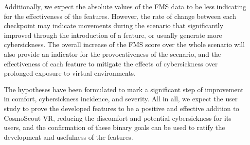 Additionally, we expect the absolute values of the FMS data to be less indicating for the effectiveness of the
features.
However, the rate of change between each checkpoint may indicate movements during the scenario that significantly
improved through the introduction of a feature, or usually generate more cybersickness.
The overall increase of the FMS score over the whole scenario will also provide an indicator for the provocativeness
of the scenario, and the effectiveness of each feature to mitigate the effects of cybersickness over prolonged exposure
to virtual environments.

The hypotheses have been formulated to mark a significant step of improvement in comfort, cybersickness
incidence, and severity.
All in all, we expect the user study to prove the developed features to be a positive and effective
addition to CosmoScout VR, reducing the discomfort and potential cybersickness for its users, and the confirmation of
these binary goals can be used to ratify the development and usefulness of the features.
